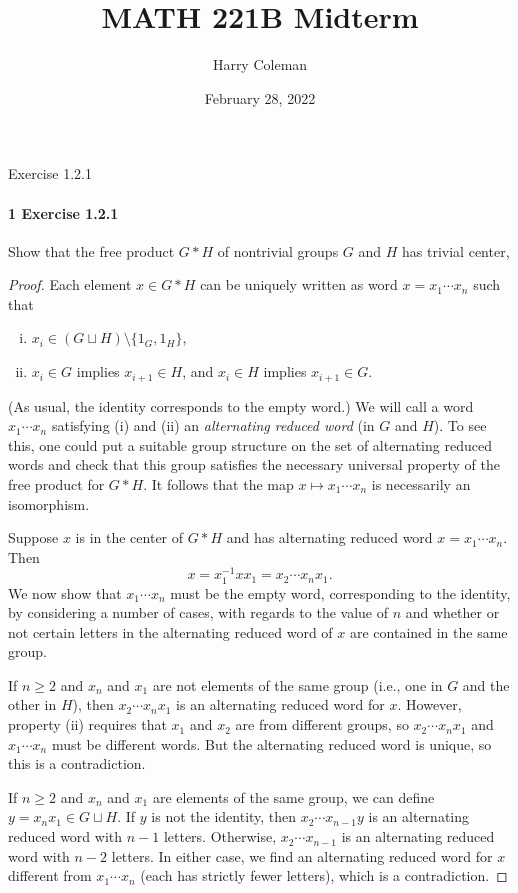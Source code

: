 \documentclass[12pt]{article}
\renewcommand{\maketitle}{\thispagestyle{title}}
\newlength{\myparskip}
\newenvironment{fullbox}{\begin{lrbox}{\savefullbox}\begin{minipage}{\dimexpr\textwidth-2\fboxsep\relax}\setlength{\parskip}{\myparskip}}{\end{minipage}\end{lrbox}\framebox[\textwidth]{\usebox{\savefullbox}}}
\newenvironment{pbox}[1][]{\begin{fullbox}\ifx#1\empty\else\paragraph{#1}\phantom{}\fi}{\end{fullbox}}
\theoremstyle{definition}
\newcommand{\<}{\langle}
\renewcommand{\>}{\rangle}
\begin{document}
\title{MATH 221B Midterm}
\author{Harry Coleman}
\date{February 28, 2022}
\maketitle

\phantom{.}

\begin{pbox}[1 Exercise 1.2.1]
    Show that the free product $G * H$ of nontrivial groups $G$ and $H$ has trivial center,
\end{pbox}

\begin{proof}
    Each element $x \in G * H$ can be uniquely written as word $x = x_1 \cdots x_n$ such that
    \begin{enumerate}[(i)]
        \item $x_i \in (G \sqcup H) \setminus \{1_G, 1_H\}$,
        \item $x_i \in G$ implies $x_{i+1} \in H$, and $x_i \in H$ implies $x_{i+1} \in G$.
    \end{enumerate}
    (As usual, the identity corresponds to the empty word.)
    We will call a word $x_1 \cdots x_n$ satisfying (i) and (ii) an \textit{alternating reduced word} (in $G$ and $H$).
    To see this, one could put a suitable group structure on the set of alternating reduced words and check that this group satisfies the necessary universal property of the free product for $G * H$.
    It follows that the map $x \mapsto x_1 \cdots x_n$ is necessarily an isomorphism.


    Suppose $x$ is in the center of $G * H$ and has alternating reduced word $x = x_1 \cdots x_n$.
    Then
    \[
        x = x_1^{-1}xx_1 = x_2 \cdots x_n x_1.
    \]
    We now show that $x_1 \cdots x_n$ must be the empty word, corresponding to the identity, by considering a number of cases, with regards to the value of $n$ and whether or not certain letters in the alternating reduced word of $x$ are contained in the same group.

    If $n \geq 2$ and $x_n$ and $x_1$ are not elements of the same group (i.e., one in $G$ and the other in $H$), then $x_2 \cdots x_n x_1$ is an alternating reduced word for $x$.
    However, property (ii) requires that $x_1$ and $x_2$ are from different groups, so $x_2 \cdots x_nx_1$ and $x_1 \cdots x_n$ must be different words.
    But the alternating reduced word is unique, so this is a contradiction.

    If $n \geq 2$ and $x_n$ and $x_1$ are elements of the same group, we can define $y = x_nx_1 \in G \sqcup H$.
    If $y$ is not the identity, then $x_2 \cdots x_{n-1}y$ is an alternating reduced word with $n-1$ letters.
    Otherwise, $x_2 \cdots x_{n-1}$ is an alternating reduced word with $n-2$ letters.
    In either case, we find an alternating reduced word for $x$ different from $x_1 \cdots x_n$ (each has strictly fewer letters), which is a contradiction.


\end{proof}
\end{document}

